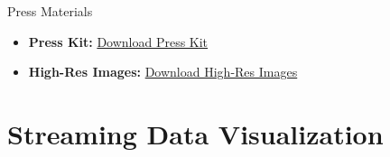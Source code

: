 \documentclass{article}
\begin{document}
    \noindent
    {\Large Press Materials}
    \begin{itemize}[leftmargin=*]
        \item \textbf{Press Kit:} \href{https://vozzrich.com/press}{Download Press Kit}
        \item \textbf{High-Res Images:} \href{https://vozzrich.com/images}{Download High-Res Images}
    \end{itemize}

\section*{\textcolor{maincolor}{Streaming Data Visualization}}

\end{document}
